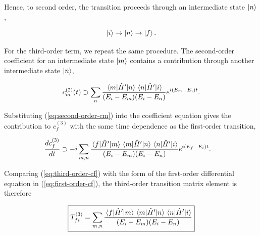 \documentclass[12pt,a4paper]{article}
\begin{document}
\begin{solution_pset}
		Hence, to second order, the transition proceeds through an intermediate
		state $\ket{n}$,

		\begin{equation}
			\ket{i}
			\rightarrow
			\ket{n}
			\rightarrow
			\ket{f}.
			\label{eq:second-order-transition}
		\end{equation}

		For the third-order term, we repeat the same procedure. The second-order
		coefficient for an intermediate state $\ket{m}$ contains a contribution
		through another intermediate state $\ket{n}$,

		\begin{equation}
			c_m^{(2)}(t)
			\supset
			\sum_n
			\frac{
				\matrixel{m}{\hat H'}{n}
				\matrixel{n}{\hat H'}{i}
			}{
				(E_i-E_m)(E_i-E_n)
			}
			e^{i(E_m-E_i)t}.
		\label{eq:second-order-cm}
		\end{equation}

		Substituting (\ref{eq:second-order-cm}) into the coefficient equation gives
		the contribution to $c_f^{(3)}$ with the same time dependence as the
		first-order transition,

		\begin{equation}
			\begin{aligned}
			\dv{c_f^{(3)}}{t}
			&\supset
			-i
			\sum_{m,n}
			\frac{
				\matrixel{f}{\hat H'}{m}
				\matrixel{m}{\hat H'}{n}
				\matrixel{n}{\hat H'}{i}
			}{
				(E_i-E_m)(E_i-E_n)
			}
			e^{i(E_f-E_i)t}.
			\end{aligned}
			\label{eq:third-order-cf}
		\end{equation}

		Comparing (\ref{eq:third-order-cf}) with the form of the first-order
		differential equation in (\ref{eq:first-order-cf}), the third-order transition
		matrix element is therefore

		\begin{equation}
			\boxed{
				T_{fi}^{(3)}
				=
				\sum_{m,n}
				\frac{
					\matrixel{f}{\hat H'}{m}
					\matrixel{m}{\hat H'}{n}
					\matrixel{n}{\hat H'}{i}
				}{
				(E_i-E_m)(E_i-E_n)
				}
			}
			\label{eq:Tfi-third}
		\end{equation}




\end{solution_pset}
\end{document}
